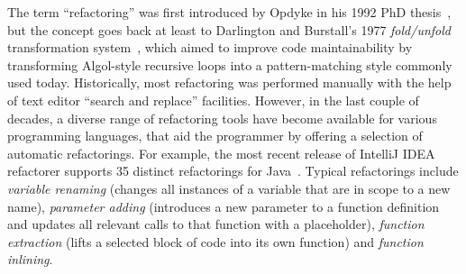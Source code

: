 \documentclass[final]{jfp1}
\begin{document}
\noindent
The term ``refactoring'' was first introduced by Opdyke in his 1992 PhD
thesis~\cite{opdyke}, but the concept goes back at least to Darlington and
Burstall's 1977 \emph{fold/unfold} transformation system~\cite{darlington77},
which aimed to 
improve code maintainability by transforming Algol-style recursive loops into a
pattern-matching style commonly used today.
Historically, most refactoring was performed manually with the help of
text editor ``search and replace'' facilities.
However,  in the
last couple of decades, a diverse range of refactoring tools have become
available for various programming languages,
that aid the
programmer by offering a selection of automatic refactorings. 
For example, the most recent release of IntelliJ IDEA refactorer supports 35
distinct refactorings for Java~\cite{intellij}.
Typical refactorings include \emph{variable renaming} (changes all instances
of a variable that are in scope to a new name), \emph{parameter adding} 
(introduces a new parameter to a function definition and updates all relevant
calls to that function with a placeholder), \emph{function extraction} (lifts
a selected block of code into its own function) and \emph{function inlining}.



\end{document}
